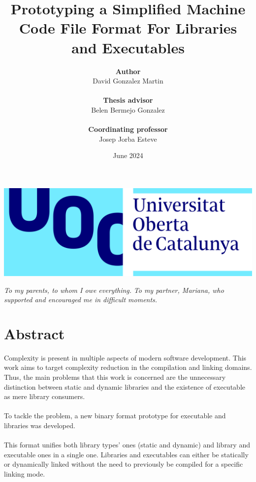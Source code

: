 \documentclass[12pt]{article}
\title{\textbf{Prototyping a Simplified Machine Code File Format For Libraries and Executables}}
\author{\textbf{Author}\\David Gonzalez Martin\\\\\textbf{Thesis advisor}\\Belen Bermejo Gonzalez\\\\\textbf{Coordinating professor}\\Josep Jorba Esteve}
\date{June 2024}
\begin{document}
	\maketitle{}
	\begin{center}
		\includegraphics[scale=0.1]{assets/logouoc.png}
	\end{center}
	\newpage
	\mbox{}
	\vfill{}
	\begin{flushright}
		\textit{To my parents, to whom I owe everything.}
		\textit{To my partner, Mariana, who supported and encouraged me in difficult moments.}
	\end{flushright}
		
	\vfill{}
	\mbox{}
	\newpage

	\section*{Abstract}
	\paragraph{}Complexity is present in multiple aspects of modern software development. This work aims to target complexity reduction in the compilation and linking domains. Thus, the main problems that this work is concerned are the unnecessary distinction between static and dynamic libraries and the existence of executable as mere library consumers.
	\paragraph{}To tackle the problem, a new binary format prototype for executable and libraries was developed.
	\paragraph{}This format unifies both library types' ones (static and dynamic) and library and executable ones in a single one. Libraries and executables can either be statically or dynamically linked without the need to previously be compiled for a specific linking mode.
\end{document}
